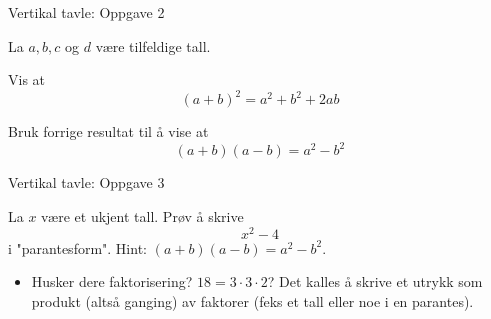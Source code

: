 \documentclass[aspectratio=119,12pt]{beamer}
\begin{document}
\begin{frame}{Vertikal tavle: Oppgave 2}

    La $a,b,c$ og $d$ være tilfeldige tall.

    Vis at  \begin{equation}
        (a +b)^{2} = a^2 + b^2 + 2ab
    \end{equation}

    Bruk forrige resultat til å vise at
    \begin{equation}
        (a +b)(a-b) = a^2 - b^2 
    \end{equation}


\end{frame}


\begin{frame}{Vertikal tavle: Oppgave 3}


    La $x$ være et ukjent tall. 
    Prøv å skrive \begin{equation}
        x^2 - 4    
    \end{equation}
    i "parantesform". Hint: $(a+b)(a-b) = a^2 - b^2$.  


\vskip 0.4cm
    \begin{itemize}
        \item Husker dere faktorisering? $18 = 3\cdot 3\cdot 2$? Det kalles å skrive et utrykk som produkt (altså ganging) av faktorer (feks et tall eller noe i en parantes).   
    \end{itemize}




\end{frame}
\end{document}
